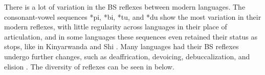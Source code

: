 \documentclass[output=paper,colorlinks,citecolor=brown
]{langscibook}
\begin{document}
There is a lot of variation in the BS reflexes between modern languages. The consonant-vowel sequences *pi, *bi, *tu, and *du show the most variation in their modern reflexes, with little regularity across languages in their place of articulation, and in some languages these sequences even retained their status as stops, like in Kinyarwanda \citep{kieffer2021} and Shi \citep{polak1975}. Many languages had their BS reflexes undergo further changes, such as deaffrication, devoicing, debuccalization, and elision \citep{Janson2007}. The diversity of reflexes can be seen in  below.

\begin{table}
\caption{BS Reflexes in some East Bantu Languages
\citep{bastin2002,katamba1974,kieffer2021,poletto1998,hinnebusch1981,Janson2007}
}
\label{tab:kieffer:BS}
\end{table}
\end{document}
